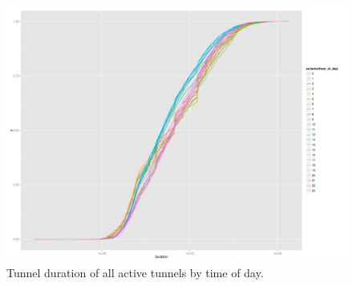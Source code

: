 \begin{figure}[htb]
  \centering
  \includegraphics[width=1.0\textwidth]{images/R-duration-activetunnels-hours-ecdf.pdf}
  \caption{Tunnel duration of all active tunnels by time of day.}
 \label{c4:fig:duration-timeofday-ecdf}
\end{figure}







